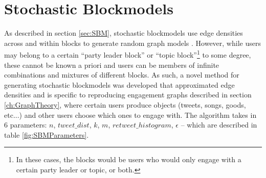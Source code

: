 \section{Stochastic Blockmodels}\label{sec:AdaptedSBMs}

As described in section \ref{sec:SBM}, stochastic blockmodels use edge densities
across and within blocks to generate random graph models
\cite{holland1983stochastic}. However, while users may belong to a certain
``party leader block'' or ``topic block''\footnote{In these cases, the blocks
would be users who would only engage with a certain party leader or topic, or
both.} to some degree, these cannot be known a priori and users can be members
of infinite combinations and mixtures of different blocks. As such, a novel
method for generating stochastic blockmodels was developed that approximated
edge densities and is specific to reproducing engagement graphs described in
section \ref{ch:GraphTheory}, where certain users produce objects (tweets,
songs, goods, etc...) and other users choose which ones to engage with. The
algorithm takes in 6 parameters: $n$, $tweet\_dist$, $k$, $m$,
$retweet\_histogram$, $\epsilon$ -- which are described in table
\ref{fig:SBMParameters}.

